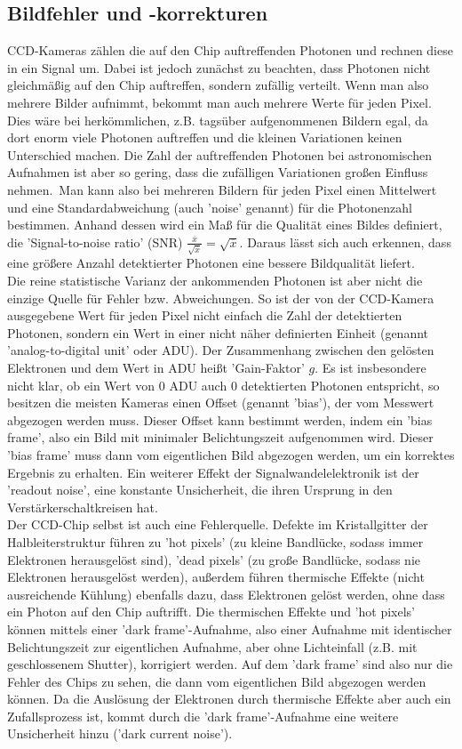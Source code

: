 \subsection{Bildfehler und -korrekturen}
CCD-Kameras zählen die auf den Chip auftreffenden Photonen und rechnen diese in ein Signal um. Dabei ist jedoch zunächst zu beachten, dass Photonen nicht gleichmäßig auf den Chip auftreffen, sondern zufällig verteilt. Wenn man also mehrere Bilder aufnimmt, bekommt man auch mehrere Werte für jeden Pixel. Dies wäre bei herkömmlichen, z.B. tagsüber aufgenommenen Bildern egal, da dort enorm viele Photonen auftreffen und die kleinen Variationen keinen Unterschied machen. Die Zahl der auftreffenden Photonen bei astronomischen Aufnahmen ist aber so gering, dass die zufälligen Variationen großen Einfluss nehmen.\
Man kann also bei mehreren Bildern für jeden Pixel einen Mittelwert und eine Standardabweichung (auch 'noise' genannt) für die Photonenzahl bestimmen. Anhand dessen wird ein Maß für die Qualität eines Bildes definiert, die 'Signal-to-noise ratio' (SNR) $\frac{\overline{x}}{\sqrt{\overline{x}}} = \sqrt{\overline{x}}$.  Daraus lässt sich auch erkennen, dass eine größere Anzahl detektierter Photonen eine bessere Bildqualität liefert.\\
Die reine statistische Varianz der ankommenden Photonen ist aber nicht die einzige Quelle für Fehler bzw. Abweichungen. So ist der von der CCD-Kamera ausgegebene Wert für jeden Pixel nicht einfach die Zahl der detektierten Photonen, sondern ein Wert in einer nicht näher definierten Einheit (genannt 'analog-to-digital unit' oder ADU). Der Zusammenhang zwischen den gelösten Elektronen und dem Wert in ADU heißt 'Gain-Faktor' $g$. Es ist insbesondere nicht klar, ob ein Wert von 0 ADU auch 0 detektierten Photonen entspricht, so besitzen die meisten Kameras einen Offset (genannt 'bias'), der vom Messwert abgezogen werden muss. Dieser Offset kann bestimmt werden, indem ein 'bias frame', also ein Bild mit minimaler Belichtungszeit aufgenommen wird. Dieser 'bias frame' muss dann vom eigentlichen Bild abgezogen werden, um ein korrektes Ergebnis zu erhalten. Ein weiterer Effekt der Signalwandelelektronik ist der 'readout noise', eine konstante Unsicherheit, die ihren Ursprung in den Verstärkerschaltkreisen hat.
\\
Der CCD-Chip selbst ist auch eine Fehlerquelle. Defekte im Kristallgitter der Halbleiterstruktur führen zu 'hot pixels' (zu kleine Bandlücke, sodass immer Elektronen herausgelöst sind), 'dead pixels' (zu große Bandlücke, sodass nie Elektronen herausgelöst werden), außerdem führen thermische Effekte (nicht ausreichende Kühlung) ebenfalls dazu, dass Elektronen gelöst werden, ohne dass ein Photon auf den Chip auftrifft. Die thermischen Effekte und 'hot pixels' können mittels einer 'dark frame'-Aufnahme, also einer Aufnahme mit identischer Belichtungszeit zur eigentlichen Aufnahme, aber ohne Lichteinfall (z.B. mit geschlossenem Shutter), korrigiert werden. Auf dem 'dark frame' sind also nur die Fehler des Chips zu sehen, die dann vom eigentlichen Bild abgezogen werden können. Da die Auslösung der Elektronen durch thermische Effekte aber auch ein Zufallsprozess ist, kommt durch die 'dark frame'-Aufnahme eine weitere Unsicherheit hinzu ('dark current noise').\
